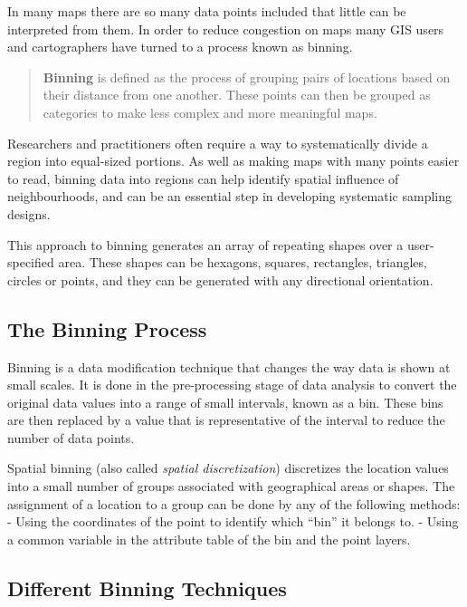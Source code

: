 \documentclass[
  krantz2]{krantz}
\begin{document}
In many maps there are so many data points included that little can be interpreted from them. In order to reduce congestion on maps many GIS users and cartographers have turned to a process known as binning.

\begin{quote}
\textbf{Binning} is defined as the process of grouping pairs of locations based on their distance from one another. These points can then be grouped as categories to make less complex and more meaningful maps.
\end{quote}

Researchers and practitioners often require a way to systematically divide a region into equal-sized portions. As well as making maps with many points easier to read, binning data into regions can help identify spatial influence of neighbourhoods, and can be an essential step in developing systematic sampling designs.

This approach to binning generates an array of repeating shapes over a user-specified area. These shapes can be hexagons, squares, rectangles, triangles, circles or points, and they can be generated with any directional orientation.

\hypertarget{the-binning-process}{%
\subsection{The Binning Process}\label{the-binning-process}}

Binning is a data modification technique that changes the way data is shown at small scales. It is done in the pre-processing stage of data analysis to convert the original data values into a range of small intervals, known as a bin. These bins are then replaced by a value that is representative of the interval to reduce the number of data points.

Spatial binning (also called \emph{spatial discretization}) discretizes the location values into a small number of groups associated with geographical areas or shapes. The assignment of a location to a group can be done by any of the following methods:
- Using the coordinates of the point to identify which ``bin'' it belongs to.
- Using a common variable in the attribute table of the bin and the point layers.

\hypertarget{different-binning-techniques}{%
\subsection{Different Binning Techniques}\label{different-binning-techniques}}
\end{document}
